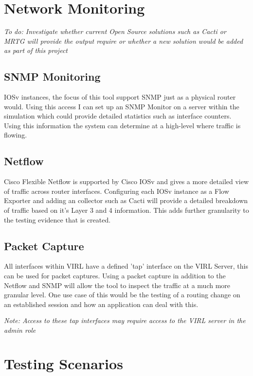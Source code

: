 \documentclass[11pt]{report}
\begin{document}
\section{Network Monitoring}

\textit{To do: Investigate whether current Open Source solutions such as Cacti or MRTG will provide the output require or whether a new solution would be added as part of this project}

\subsection{SNMP Monitoring}

IOSv instances, the focus of this tool support SNMP just as a physical router would. Using this access I can set up an SNMP Monitor on a server within the simulation which could provide detailed statistics such as interface counters. Using this information the system can determine at a high-level where traffic is flowing.

\subsection{Netflow}

Cisco Flexible Netflow is supported by Cisco IOSv and gives a more detailed view of traffic across router interfaces. Configuring each IOSv instance as a Flow Exporter and adding an collector such as Cacti will provide a detailed breakdown of traffic based on it's Layer 3 and 4 information. This adds further granularity to the testing evidence that is created.

\subsection{Packet Capture}

All interfaces within VIRL have a defined 'tap' interface on the VIRL Server, this can be used for packet captures. Using a packet capture in addition to the Netflow and SNMP will allow the tool to inspect the traffic at a much more granular level. One use case of this would be the testing of a routing change on an established session and how an application can deal with this.

\textit{Note: Access to these tap interfaces may require access to the VIRL server in the admin role}
 

\section{Testing Scenarios}
\end{document}
